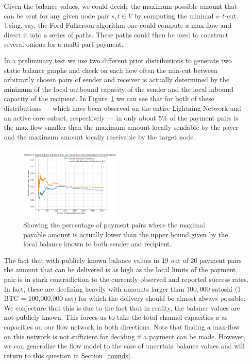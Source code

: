 \documentclass[10pt,twocolumn]{article}
\begin{document}
Given the balance values, we could decide the maximum possible amount that can be sent for any given node pair $s,t \in V$ by computing the minimal $s$--$t$-cut.
Using, say, the Ford-Fulkerson algorithm\cite{ford_fulkerson_1956} one could compute a max-flow and disect it into a series of paths.
These paths could then be used to construct several onions for a multi-part payment.

In a preliminary test we use two different prior distributions to generate two static balance graphs and check on each how often the min-cut between arbitrarily chosen pairs of sender and receiver is actually determined by the minimum of the local outbound capacity of the sender and the local inbound capacity of the recipient.
In Figure~\ref{fig:mincut} we can see that for both of these distributions --- which have been observed on the entire Lightning Network and an active core subset, respectively --- in only about $5\%$ of the payment pairs is the max-flow smaller than the maximum amount locally sendable by the payer and the maximum amount locally receivable by the target node.
\begin{figure}[htpb]
  \center
  \includegraphics[width=0.45\textwidth]{img/maxFlowFraction.png}
  \caption{Showing the percentage of payment pairs where the maximal payable amount is actually lower than the upper bound given by the local balance known to both sender and recipient.}
  \label{fig:mincut}
\end{figure}

The fact that with publicly known balance values in $19$ out of $20$ payment pairs the amount that can be delivered is as high as the local limits of the payment pair is in stark contradiction to the currently observed and reported \cite{DBLP:journals/corr/abs-1911-09432,DBLP:journals/corr/abs-2006-14358,lange2021impact, pickhardt2021security} success rates. In fact, these are declining heavily with amounts larger than $100,000$ satoshi (1 BTC = 100,000,000 sat) for which the delivery should be almost always possible.
We conjecture that this is due to the fact that in reality, the balance values are not publicly known.
This forces us to take the total channel capacities $u$ as capacities on our flow network in both directions.
Note that finding a max-flow on this network is not sufficient for deciding if a payment can be made.
However, we can generalize the flow model to the case of uncertain balance values and will return to this question in Section~\ref{rounds}.
\end{document}
